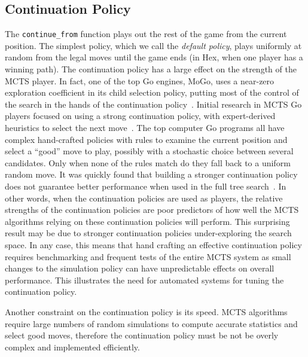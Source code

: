 \documentclass{acm_proc_article-sp}
\begin{document}
\subsection{Continuation Policy}

The \verb+continue_from+ function plays out the rest of the game from the current position. 
The simplest policy, which we call the \emph{default policy},
 plays uniformly at random from the legal moves until the game ends (in Hex, when one player has a winning path). 
The continuation policy has a large effect on the strength of the MCTS player.
In fact, one of the top Go engines, MoGo, uses a near-zero exploration coefficient in its child selection policy,
putting most of the control of the search in the hands of the continuation policy~\cite{gelly2007combining}.
Initial research in MCTS Go players focused on using a strong continuation policy, with expert-derived heuristics to select the next move~\cite{chaslot2010adding}. 
The top computer Go programs all have complex hand-crafted policies with rules to examine the current position and select a ``good'' move to play, possibly with a stochastic choice between several candidates. 
Only when none of the rules match do they fall back to a uniform random move. 
It was quickly found that building a stronger continuation policy does not guarantee better performance when used in the full tree search~\cite{gelly2006modification}. 
In other words, when the continuation policies are used as players, the relative strengths of the continuation policies are poor predictors
of how well the MCTS algorithms relying on these continuation policies will perform.
This surprising result may be due to stronger continuation policies under-exploring the search space.
In any case, this means that hand crafting an effective continuation policy requires benchmarking and frequent tests of the entire
MCTS system as small changes to the simulation policy can have unpredictable effects on overall performance.
This illustrates the need for automated systems for tuning the continuation policy.

Another constraint on the continuation policy is its speed.  
MCTS algorithms require large numbers of random simulations to compute accurate statistics and select good moves, therefore the continuation policy must be not be overly complex and implemented efficiently.
\end{document}
